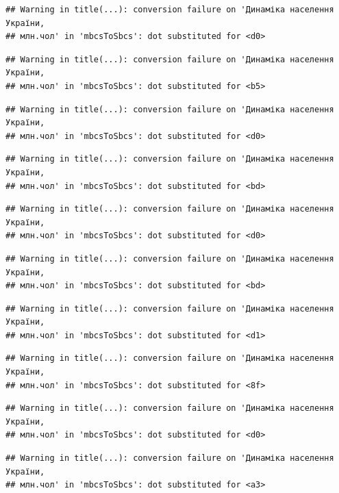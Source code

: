 \documentclass[
]{article}
\begin{document}
\begin{verbatim}
## Warning in title(...): conversion failure on 'Динаміка населення України,
## млн.чол' in 'mbcsToSbcs': dot substituted for <d0>
\end{verbatim}

\begin{verbatim}
## Warning in title(...): conversion failure on 'Динаміка населення України,
## млн.чол' in 'mbcsToSbcs': dot substituted for <b5>
\end{verbatim}

\begin{verbatim}
## Warning in title(...): conversion failure on 'Динаміка населення України,
## млн.чол' in 'mbcsToSbcs': dot substituted for <d0>
\end{verbatim}

\begin{verbatim}
## Warning in title(...): conversion failure on 'Динаміка населення України,
## млн.чол' in 'mbcsToSbcs': dot substituted for <bd>
\end{verbatim}

\begin{verbatim}
## Warning in title(...): conversion failure on 'Динаміка населення України,
## млн.чол' in 'mbcsToSbcs': dot substituted for <d0>
\end{verbatim}

\begin{verbatim}
## Warning in title(...): conversion failure on 'Динаміка населення України,
## млн.чол' in 'mbcsToSbcs': dot substituted for <bd>
\end{verbatim}

\begin{verbatim}
## Warning in title(...): conversion failure on 'Динаміка населення України,
## млн.чол' in 'mbcsToSbcs': dot substituted for <d1>
\end{verbatim}

\begin{verbatim}
## Warning in title(...): conversion failure on 'Динаміка населення України,
## млн.чол' in 'mbcsToSbcs': dot substituted for <8f>
\end{verbatim}

\begin{verbatim}
## Warning in title(...): conversion failure on 'Динаміка населення України,
## млн.чол' in 'mbcsToSbcs': dot substituted for <d0>
\end{verbatim}

\begin{verbatim}
## Warning in title(...): conversion failure on 'Динаміка населення України,
## млн.чол' in 'mbcsToSbcs': dot substituted for <a3>
\end{verbatim}
\end{document}
